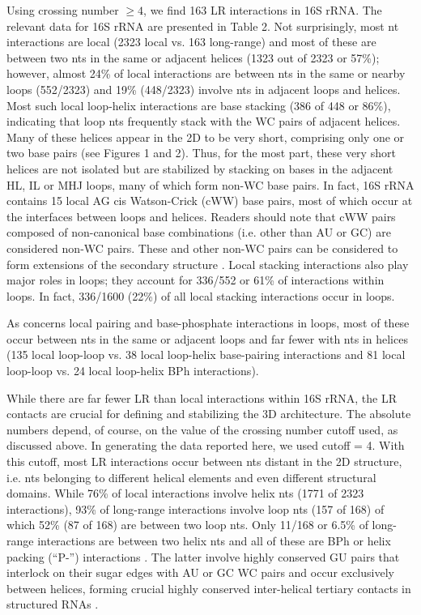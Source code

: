 Using crossing number $\ge 4$, we find 163 LR interactions in 16S rRNA. The
relevant data for \EC{} 16S rRNA are presented in Table 2. Not surprisingly,
most nt interactions are local (2323 local vs. 163 long-range) and most of these
are between two nts in the same or adjacent helices (1323 out of 2323 or 57\%);
however, almost 24\% of local interactions are between nts in the same or nearby
loops (552/2323) and 19\% (448/2323) involve nts in adjacent loops and helices.
Most such local loop-helix interactions are base stacking (386 of 448 or 86\%),
indicating that loop nts frequently stack with the WC pairs of adjacent helices.
Many of these helices appear in the 2D to be very short, comprising only one or
two base pairs (see Figures 1 and 2). Thus, for the most part, these very short
helices are not isolated but are stabilized by stacking on bases in the adjacent
HL, IL or MHJ loops, many of which form non-WC base pairs. In fact, 16S rRNA
contains 15 local AG cis Watson-Crick (cWW) base pairs, most of which occur at
the interfaces between loops and helices. Readers should note that cWW pairs
composed of non-canonical base combinations (i.e. other than AU or GC) are
considered non-WC pairs. These and other non-WC pairs can be considered to form
extensions of the secondary structure \cite{Gutell1990}. Local stacking
interactions also play major roles in loops; they account for 336/552 or 61\% of
interactions within loops. In fact, 336/1600 (22\%) of all local stacking
interactions occur in loops. 

As concerns local pairing and base-phosphate interactions in loops, most of
these occur between nts in the same or adjacent loops and far fewer with nts in
helices (135 local loop-loop vs. 38 local loop-helix base-pairing interactions
and 81 local loop-loop vs. 24 local loop-helix BPh interactions). 

While there are far fewer LR than local interactions within 16S rRNA, the LR
contacts are crucial for defining and stabilizing the 3D architecture. The
absolute numbers depend, of course, on the value of the crossing number cutoff
used, as discussed above. In generating the data reported here, we used cutoff =
4. With this cutoff, most LR interactions occur between nts distant in the 2D
structure, i.e. nts belonging to different helical elements and even
different structural domains. While 76\% of local interactions involve helix
nts (1771 of 2323 interactions), 93\% of long-range interactions involve loop
nts (157 of 168) of which 52\% (87 of 168) are between two loop nts.  Only
11/168 or 6.5\% of long-range interactions are between two helix nts and all
of these are BPh or helix packing  (``P-'') interactions \cite{Mokdad2006b}.
The latter involve highly conserved GU pairs that interlock on their sugar
edges with AU or GC WC pairs and occur exclusively between helices, forming
crucial highly conserved inter-helical tertiary contacts in structured RNAs
\cite{Gagnon2006, Gagnon2002}. 

